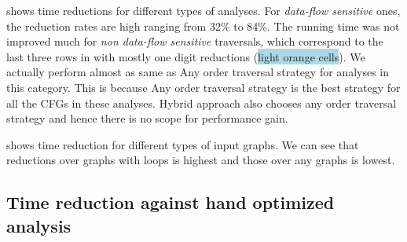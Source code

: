  shows time reductions for 
different types of analyses. For \textit{data-flow sensitive} ones, the 
reduction rates are high ranging from 32\% to 84\%. 
The running time was not improved much for \emph{non data-flow sensitive} 
traversals, which correspond to the last three rows in  
with mostly one digit reductions (\colorbox{lightblue}{light orange 
cells}). 
We actually perform almost as same as Any order traversal 
strategy for analyses in this category. This is because Any order traversal 
strategy is the best strategy for all the CFGs in these analyses. Hybrid 
approach also chooses any order traversal strategy and hence there is no 
scope for performance gain. 

 shows time reduction for
different \graphprop{} types of input graphs. We can see that
reductions over graphs with loops is highest and those over any graphs
is lowest.

\subsection{Time reduction against hand optimized analysis}
\label{sec:hand-optimized}


